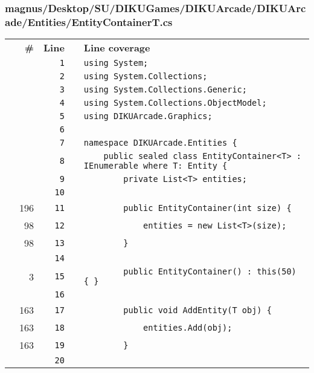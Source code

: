 \documentclass[a4paper,landscape,10pt]{article}
\begin{document}
\subsubsection{magnus/Desktop/SU/DIKUGames/DIKUArcade/DIKUArcade/Entities/EntityContainerT.cs}
\begin{longtable}[l]{lrrll}
\textbf{} & \textbf{\#} & \textbf{Line} & \textbf{} & \textbf{Line coverage}\\
\cellcolor{gray} &  & \verb~1~ & & \verb~using System;~\\
\cellcolor{gray} &  & \verb~2~ & & \verb~using System.Collections;~\\
\cellcolor{gray} &  & \verb~3~ & & \verb~using System.Collections.Generic;~\\
\cellcolor{gray} &  & \verb~4~ & & \verb~using System.Collections.ObjectModel;~\\
\cellcolor{gray} &  & \verb~5~ & & \verb~using DIKUArcade.Graphics;~\\
\cellcolor{gray} &  & \verb~6~ & & \verb~~\\
\cellcolor{gray} &  & \verb~7~ & & \verb~namespace DIKUArcade.Entities {~\\
\cellcolor{gray} &  & \verb~8~ & & \verb~    public sealed class EntityContainer<T> : IEnumerable where T: Entity {~\\
\cellcolor{gray} &  & \verb~9~ & & \verb~        private List<T> entities;~\\
\cellcolor{gray} &  & \verb~10~ & & \verb~~\\
\cellcolor{green} & 196 & \verb~11~ & & \verb~        public EntityContainer(int size) {~\\
\cellcolor{green} & 98 & \verb~12~ & & \verb~            entities = new List<T>(size);~\\
\cellcolor{green} & 98 & \verb~13~ & & \verb~        }~\\
\cellcolor{gray} &  & \verb~14~ & & \verb~~\\
\cellcolor{green} & 3 & \verb~15~ & & \verb~        public EntityContainer() : this(50) { }~\\
\cellcolor{gray} &  & \verb~16~ & & \verb~~\\
\cellcolor{green} & 163 & \verb~17~ & & \verb~        public void AddEntity(T obj) {~\\
\cellcolor{green} & 163 & \verb~18~ & & \verb~            entities.Add(obj);~\\
\cellcolor{green} & 163 & \verb~19~ & & \verb~        }~\\
\cellcolor{gray} &  & \verb~20~ & & \verb~~\\

\end{longtable}
\end{document}
